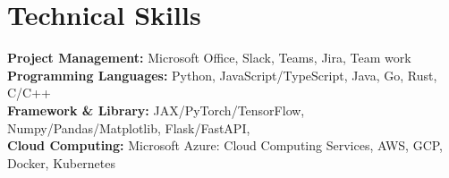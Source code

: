 
\ifcv
\section*{Technical Skills}


\textbf{Project Management:} Microsoft Office, Slack, Teams, Jira, Team work \\
\textbf{Programming Languages:} Python, JavaScript/TypeScript, Java, Go, Rust, C/C++ \\
\textbf{Framework \& Library:} JAX/PyTorch/TensorFlow, Numpy/Pandas/Matplotlib, Flask/FastAPI, \\
\textbf{Cloud Computing:} Microsoft Azure: Cloud Computing Services, AWS, GCP, Docker, Kubernetes \\
\fi